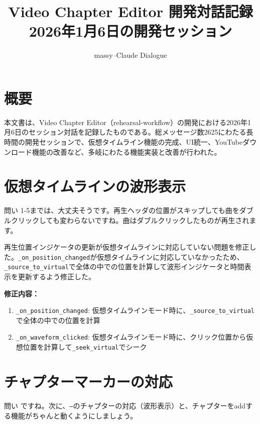 \documentclass[10pt,a4paper,twocolumn]{article}
\title{\textbf{Video Chapter Editor 開発対話記録}\\
\large 2026年1月6日の開発セッション}
\author{massy--Claude Dialogue}
\date{}
\begin{document}
\maketitle
\thispagestyle{firstpage}

\section*{概要}

本文書は、Video Chapter Editor（rehearsal-workflow）の開発における2026年1月6日のセッション対話を記録したものである。総メッセージ数2625にわたる長時間の開発セッションで、仮想タイムライン機能の完成、UI統一、YouTubeダウンロード機能の改善など、多岐にわたる機能実装と改善が行われた。

\section{仮想タイムラインの波形表示}

\begin{itembox}[l]{問い}
1-5までは、大丈夫そうです。再生ヘッダの位置がスキップしても曲をダブルクリックしても変わらないですね。曲はダブルクリックしたものが再生されます。
\end{itembox}

再生位置インジケータの更新が仮想タイムラインに対応していない問題を修正した。\texttt{\_on\_position\_changed}が仮想タイムラインに対応していなかったため、\texttt{\_source\_to\_virtual}で全体の中での位置を計算して波形インジケータと時間表示を更新するよう修正した。

\textbf{修正内容：}
\begin{enumerate}
    \item \texttt{\_on\_position\_changed}: 仮想タイムラインモード時に、\texttt{\_source\_to\_virtual}で全体の中での位置を計算
    \item \texttt{\_on\_waveform\_clicked}: 仮想タイムラインモード時に、クリック位置から仮想位置を計算して\texttt{\_seek\_virtual}でシーク
\end{enumerate}

\section{チャプターマーカーの対応}

\begin{itembox}[l]{問い}
ですね。次に、\texttt{--}のチャプターの対応（波形表示）と、チャプターをaddする機能がちゃんと動くようにしましょう。
\end{itembox}
\end{document}
